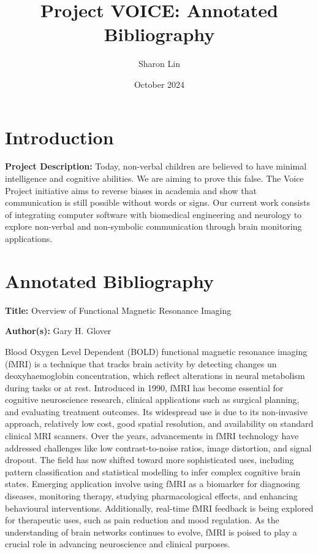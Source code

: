 \documentclass[12pt, research paper]{report}
\title{Project VOICE: Annotated Bibliography}
\author{Sharon Lin}
\date{October 2024}
\begin{document}
	
	\maketitle
	
	\section*{Introduction}
	
	\noindent\textbf{Project Description:} Today, non-verbal children are believed to have minimal intelligence and cognitive abilities. We are aiming to prove this false. The Voice Project initiative aims to reverse biases in academia and show that communication is still possible without words or signs. Our current work consists of integrating computer software with biomedical engineering and neurology to explore non-verbal and non-symbolic communication through brain monitoring applications.
	
	\vspace{10pt}
	
	\section*{Annotated Bibliography} 
	\textbf{Title:} Overview of Functional Magnetic Resonance Imaging
	
	\noindent \textbf{Author(s):} Gary H. Glover
	\bigskip 
	
	Blood Oxygen Level Dependent (BOLD) functional magnetic resonance imaging (fMRI) is a technique that tracks brain activity by detecting changes un deoxyhaemoglobin concentration, which reflect alterations in neural metabolism during tasks or at rest. Introduced in 1990, fMRI has become essential for cognitive neuroscience research, clinical applications such as surgical planning, and evaluating treatment outcomes. Its widespread use is due to its non-invasive approach, relatively low cost, good spatial resolution, and availability on standard clinical MRI scanners. Over the years, advancements in fMRI technology have addressed challenges like low contrast-to-noise ratios, image distortion, and signal dropout. The field has now shifted toward more sophisticated uses, including pattern classification and statistical modelling to infer complex cognitive brain states. Emerging application involve using fMRI as a biomarker for diagnosing diseases, monitoring therapy, studying pharmacological effects, and enhancing behavioural interventions. Additionally, real-time fMRI feedback is being explored for therapeutic uses, such as pain reduction and mood regulation. As the understanding of brain networks continues to evolve, fMRI is poised to play a crucial role in advancing neuroscience and clinical purposes.
	\bigskip
	
\end{document}
